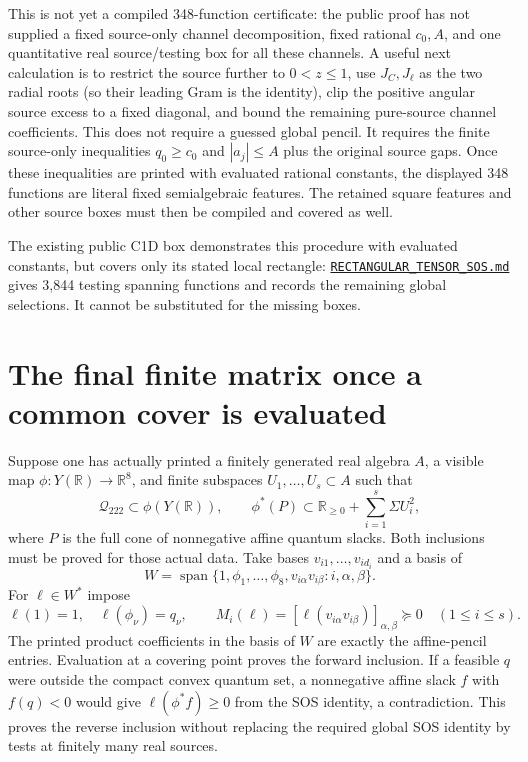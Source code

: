 \documentclass[11pt]{article}
\newcommand{\R}{\mathbb R}
\begin{document}
This is not yet a compiled 348-function certificate: the public
proof has not supplied a fixed source-only channel decomposition,
fixed rational $c_0,A$, and one quantitative real source/testing
box for all these channels. A useful next
calculation is to restrict the source further to $0<z\le1$,
use $J_C,J_\ell$ as the two radial roots (so their leading Gram
is the identity), clip the positive angular source excess to a
fixed diagonal, and bound the remaining pure-source channel
coefficients. This does not require a guessed global pencil.
It requires the finite source-only inequalities $q_0\ge c_0$
and $|a_j|\le A$ plus the original source gaps. Once these
inequalities are printed with evaluated rational constants,
the displayed 348 functions are literal fixed semialgebraic
features. The retained square features and other source boxes
must then be compiled and covered as well.

The existing public C1D box demonstrates this procedure with
evaluated constants, but covers only its stated local rectangle:
\href{https://github.com/anubhav70747/q222-finite-sdp/blob/0c1ce2e15ed067a6845464e2468559cea5274f2c/extracted-lifts/c1d-local/proofs/RECTANGULAR_TENSOR_SOS.md}
{\texttt{RECTANGULAR\_TENSOR\_SOS.md}} gives 3,844 testing
spanning functions and records the remaining global selections.
It cannot be substituted for the missing boxes.

\section{The final finite matrix once a common cover is evaluated}

Suppose one has actually printed a finitely generated real algebra
$A$, a visible map $\phi:Y(\R)\to\R^8$, and finite subspaces
$U_1,\ldots,U_s\subset A$ such that
\[
 \mathcal Q_{222}\subset\phi(Y(\R)),\qquad
 \phi^*(P)\subset\R_{\ge0}+\sum_{i=1}^{s}\Sigma U_i^2,
\]
where $P$ is the full cone of nonnegative affine quantum slacks.
Both inclusions must be proved for those actual data.
Take bases $v_{i1},\ldots,v_{id_i}$ and a basis of
\[
 W=\operatorname{span}\{1,\phi_1,\ldots,\phi_8,
                v_{i\alpha}v_{i\beta}:i,\alpha,\beta\}.
\]
For $\ell\in W^*$ impose
\[
 \ell(1)=1,\quad \ell(\phi_\nu)=q_\nu,\qquad
 M_i(\ell)=[\ell(v_{i\alpha}v_{i\beta})]_{\alpha,\beta}
                         \succeq0\quad(1\le i\le s).
\]
The printed product coefficients in the basis of $W$ are exactly
the affine-pencil entries. Evaluation at a covering point proves
the forward inclusion. If a feasible $q$ were outside the compact
convex quantum set, a nonnegative affine slack $f$ with $f(q)<0$
would give
$\ell(\phi^*f)\ge0$ from the SOS identity, a contradiction.
This proves the reverse inclusion without replacing the required
global SOS identity by tests at finitely many real sources.
\end{document}
